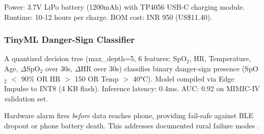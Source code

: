 \documentclass[conference,compsoc]{IEEEtran}
\begin{document}
Power: 3.7V LiPo battery (1200mAh) with TP4056 USB-C charging module. Runtime: 10-12 hours per charge. BOM cost: INR 950 (US\$11.40).

\subsubsection{TinyML Danger-Sign Classifier}

A quantized decision tree (max\_depth=5, 6 features: SpO\(_2\), HR, Temperature, Age, \(\Delta\)SpO\(_2\) over 30s, \(\Delta\)HR over 30s) classifies binary danger-sign presence (SpO\(_2\) \(<\) 90\% OR HR \(>\) 150 OR Temp \(>\) 40°C). Model compiled via Edge Impulse to INT8 (4 KB flash). Inference latency: 0.4ms. AUC: 0.92 on MIMIC-IV validation set.

Hardware alarm fires \textit{before} data reaches phone, providing fail-safe against BLE dropout or phone battery death. This addresses documented rural failure modes \cite{iot_reliability_rural}.
\end{document}
